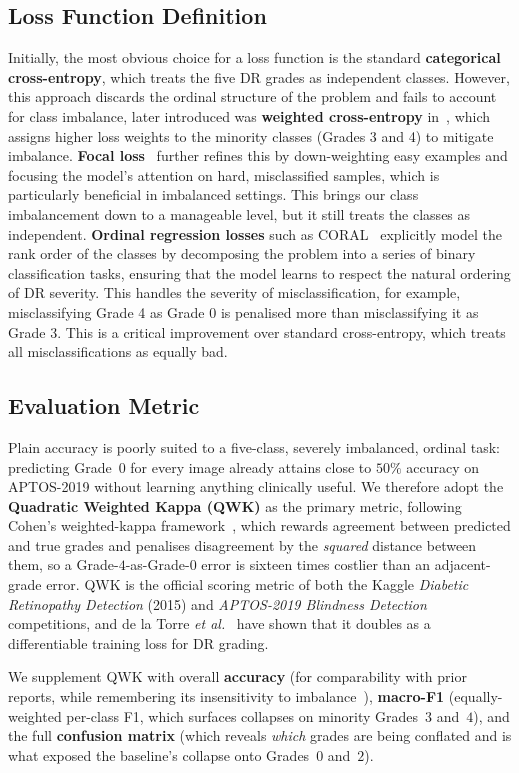 \subsection{Loss Function Definition}
Initially, the most obvious choice for a loss function is the standard \textbf{categorical cross-entropy}, which treats the five DR grades as independent classes. However, this approach discards the ordinal structure of the problem and fails to account for class imbalance, later introduced was \textbf{weighted cross-entropy} in~\cite{buda2018}, which assigns higher loss weights to the minority classes (Grades 3 and 4) to mitigate imbalance. \textbf{Focal loss}~\cite{lin2017focal} further refines this by down-weighting easy examples and focusing the model's attention on hard, misclassified samples, which is particularly beneficial in imbalanced settings. This brings our class imbalancement down to a manageable level, but it still treats the classes as independent.
\textbf{Ordinal regression losses} such as CORAL~\cite{cao2019coral} explicitly model the rank order of the classes by decomposing the problem into a series of binary classification tasks, ensuring that the model learns to respect the natural ordering of DR severity. This handles the severity of misclassification, for example, misclassifying Grade 4 as Grade 0 is penalised more than misclassifying it as Grade 3. This is a critical improvement over standard cross-entropy, which treats all misclassifications as equally bad.

\subsection{Evaluation Metric}
Plain accuracy is poorly suited to a five-class, severely imbalanced, ordinal task: predicting Grade~$0$ for every image already attains close to $50\%$ accuracy on APTOS-2019 without learning anything clinically useful. We therefore adopt the \textbf{Quadratic Weighted Kappa (QWK)} as the primary metric, following Cohen's weighted-kappa framework~\cite{cohen1968kappa}, which rewards agreement between predicted and true grades and penalises disagreement by the \emph{squared} distance between them, so a Grade-$4$-as-Grade-$0$ error is sixteen times costlier than an adjacent-grade error. QWK is the official scoring metric of both the Kaggle \emph{Diabetic Retinopathy Detection} (2015) and \emph{APTOS-2019 Blindness Detection} competitions, and de la Torre \textit{et al.}~\cite{delatorre2018kappa} have shown that it doubles as a differentiable training loss for DR grading. 

We supplement QWK with overall \textbf{accuracy} (for comparability with prior reports, while remembering its insensitivity to imbalance~\cite{buda2018}), \textbf{macro-F1} (equally-weighted per-class F1, which surfaces collapses on minority Grades~$3$ and~$4$), and the full \textbf{confusion matrix} (which reveals \emph{which} grades are being conflated and is what exposed the baseline's collapse onto Grades~$0$ and~$2$).
